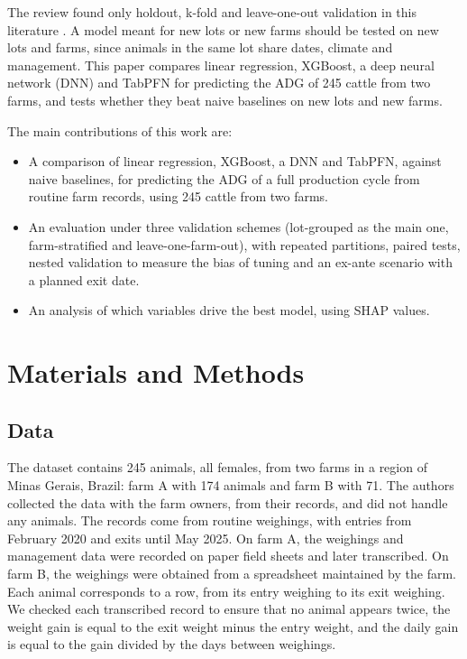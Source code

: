 \documentclass[12pt]{article}
\begin{document}
The review found only holdout, k-fold and leave-one-out validation in this literature \cite{hossain2025review}. A model meant for new lots or new farms should be tested on new lots and farms, since animals in the same lot share dates, climate and management. This paper compares linear regression, XGBoost, a deep neural network (DNN) and TabPFN for predicting the ADG of 245 cattle from two farms, and tests whether they beat naive baselines on new lots and new farms.

The main contributions of this work are:
\begin{itemize}
\item A comparison of linear regression, XGBoost, a DNN and TabPFN, against naive baselines, for predicting the ADG of a full production cycle from routine farm records, using 245 cattle from two farms.
\item An evaluation under three validation schemes (lot-grouped as the main one, farm-stratified and leave-one-farm-out), with repeated partitions, paired tests, nested validation to measure the bias of tuning and an ex-ante scenario with a planned exit date.
\item An analysis of which variables drive the best model, using SHAP values.
\end{itemize}

\section{Materials and Methods}

\subsection{Data}

The dataset contains 245 animals, all females, from two farms in a region of Minas Gerais, Brazil: farm A with 174 animals and farm B with 71. The authors collected the data with the farm owners, from their records, and did not handle any animals. The records come from routine weighings, with entries from February 2020 and exits until May 2025. On farm A, the weighings and management data were recorded on paper field sheets and later transcribed. On farm B, the weighings were obtained from a spreadsheet maintained by the farm. Each animal corresponds to a row, from its entry weighing to its exit weighing. We checked each transcribed record to ensure that no animal appears twice, the weight gain is equal to the exit weight minus the entry weight, and the daily gain is equal to the gain divided by the days between weighings.
\end{document}
